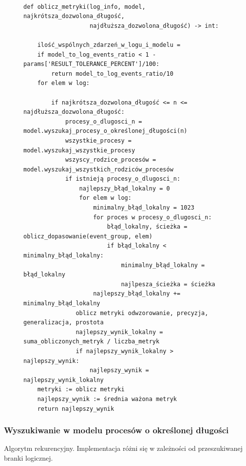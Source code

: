 \begin{figure}[!ht]
\lstset{caption=Obliczanie metryk, captionpos=b}
\lstset{label=src:best_result, frame=single}
\begin{lstlisting}

def oblicz_metryki(log_info, model, najkrótsza_dozwolona_długość, 
				   najdłuższa_dozwolona_długość) -> int:
	
	ilość_wspólnych_zdarzeń_w_logu_i_modelu = 			   
	if model_to_log_events_ratio < 1 - params['RESULT_TOLERANCE_PERCENT']/100:
        return model_to_log_events_ratio/10
	for elem w log:
		
        if najkrótsza_dozwolona_długość <= n <= najdłuższa_dozwolona_długość:
            procesy_o_dlugosci_n = model.wyszukaj_procesy_o_określonej_długości(n)
            wszystkie_procesy = model.wyszukaj_wszystkie_procesy
            wszyscy_rodzice_procesów = model.wyszukaj_wszystkich_rodziców_procesów
            if istnieją procesy_o_dlugosci_n:
                najlepszy_błąd_lokalny = 0
                for elem w log:
                    minimalny_błąd_lokalny = 1023
                    for proces w procesy_o_dlugosci_n:
                        błąd_lokalny, ścieżka = oblicz_dopasowanie(event_group, elem)
                        if błąd_lokalny < minimalny_błąd_lokalny:
                            minimalny_błąd_lokalny = błąd_lokalny
                            najlpesza_ścieżka = ścieżka
                    najlepszy_błąd_lokalny += minimalny_błąd_lokalny
               oblicz metryki odwzorowanie, precyzja, generalizacja, prostota 
               najlepszy_wynik_lokalny = suma_obliczonych_metryk / liczba_metryk
               if najlepszy_wynik_lokalny > najlepszy_wynik:
                   najlepszy_wynik = najlepszy_wynik_lokalny
	metryki := oblicz metryki 
	najlepszy_wynik := średnia ważona metryk
    return najlepszy_wynik
\end{lstlisting}
\end{figure}

\subsubsection{Wyszukiwanie w modelu procesów o określonej długości}

Algorytm rekurencyjny. Implementacja różni się w zależności od przeszukiwanej branki logicznej.
\begin{figure}[!ht]
\lstset{caption=Wyszukiwanie procesów o długości n, captionpos=b}
\lstset{label=src:get_n_length, frame=single}
\begin{lstlisting}
\end{lstlisting}
\end{figure}

